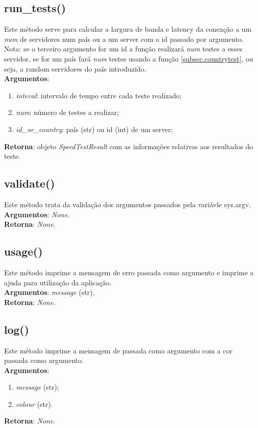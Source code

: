 \documentclass{report}
\begin{document}
\subsection{run\_tests()}
\hspace{5mm}Este método serve para calcular a largura de banda e latency da conexção a um \textit{num} de servidores num país ou a um server com o id passado por argumento.\\
Nota: se o terceiro argumento for um id a função realizará \textit{num} testes a esses servidor, se for um país fará \textit{num} testes usando a função \autoref{subsec.countrytest}, ou seja, a random servidores do país introduzido.\\
\hspace{5mm}\textbf{Argumentos}: 
\begin{enumerate}
\item \textit{inteval}: intervalo de tempo entre cada teste realizado;
\item \textit{num}: número de testes a realizar;
\item \textit{id\_or\_country}: país (str) ou id (int) de um server;
\end{enumerate}
\textbf{Retorna}: objeto \textit{SpeedTestResult} com as informações relativas aos resultados do teste.

\subsection{validate()}
Este método trata da validação dos argumentos passados pela variávle sys.argv.\\ 
\textbf{Argumentos}: \textit{None}.\\
\textbf{Retorna}: \textit{None}.

\subsection{usage()}
Este método imprime a mensagem de erro passada como argumento e imprime a ajuda para utilização da aplicação.\\ 
\textbf{Argumentos}: \textit{message} (str).\\
\textbf{Retorna}: \textit{None}.

\subsection{log()}
\label{subsec:log}
Este método imprime a mensagem de passada como argumento com a cor passada como argumento.\\ 
\textbf{Argumentos}: 
\begin{enumerate}
\item \textit{message} (str);
\item \textit{colour} (str).
\end{enumerate}
\textbf{Retorna}: \textit{None}.
\end{document}
